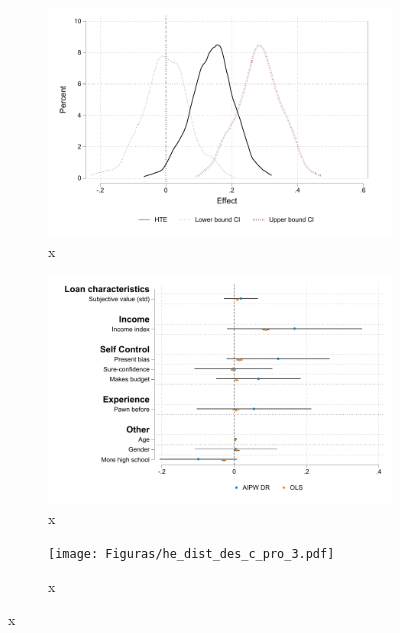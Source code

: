 \documentclass[11pt]{article}
\begin{document}
\begin{figure}[H]
    \caption{Heterogeneous Treatment Effect for Paid Loan Branches}
    \label{Treatment Effect branch}
    \begin{center}
    \begin{subfigure}{0.3\textwidth}
        \caption{x}
        \centering
        \includegraphics[width=\textwidth]{Figuras/he_dist_des_c_pro_2.pdf}
    \end{subfigure}
    \begin{subfigure}{0.3\textwidth}
        \caption{x}
        \centering
        \includegraphics[width=\textwidth]{Figuras/HE/he_int_vertical_des_c_pro_2.pdf}
    \end{subfigure}
    \begin{subfigure}{0.3\textwidth}
        \caption{x}
        \centering
        \texttt{[image: Figuras/he\_dist\_des\_c\_pro\_3.pdf]}
    \end{subfigure}

\end{center}
\end{figure}
\end{document}
